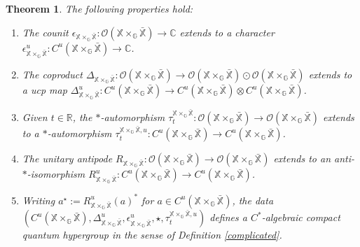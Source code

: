 \documentclass[reqno]{amsart}
\numberwithin{equation}{section}
\newtheorem{Theorem}{Theorem}[section]
\newcommand\XGX{\X\times_\G \bar{\X}}
\newcommand{\mcO}{\mathcal{O}}
\newcommand{\C}{\mathbb{C}}
\newcommand{\G}{\mathbb{G}}
\newcommand{\R}{\mathbb{R}}
\newcommand{\X}{\mathbb{X}}
\begin{document}
 \begin{Theorem}\label{mainCV} The following properties hold:
 \begin{enumerate}
     \item  The counit $\epsilon_{\XGX}: \mcO(\XGX)\to \C$ extends to a character $\epsilon_{\XGX}^u: C^u(\XGX)\to \C$.
  \item\vspace{-1.5mm} The coproduct $\Delta_{\XGX}: \mcO(\XGX)\to \mcO(\XGX)\odot \mcO(\XGX)$ extends to a ucp map $\Delta_{\XGX}^u: C^u(\XGX)\to C^u(\XGX)\otimes C^u(\XGX)$.
\item\vspace{-1.5mm} Given $t\in \R$, the $*$-automorphism $\tau^{\XGX}_t: \mcO(\XGX)\to \mcO(\XGX)$ extends to a $*$-automorphism $\tau_{t}^{\XGX,u}: C^u(\XGX)\to C^u(\XGX)$.
\item\vspace{-1.5mm} The unitary antipode $R_{\XGX}: \mcO(\XGX)\to \mcO(\XGX)$ extends to an anti-$*$-isomorphism $R_{\XGX}^u: C^u(\XGX)\to C^u(\XGX)$.
\item\vspace{-1.5mm} Writing $a^\star:= R_{\XGX}^u(a)^*$ for $a\in C^u(\XGX)$, the data $(C^u(\XGX), \Delta_{\XGX}^u, \epsilon_{\XGX}^u, \star, \tau_t^{\XGX,u})$ defines a $C^*$-algebraic compact quantum hypergroup in the sense of Definition \ref{complicated}.
     \end{enumerate}
 \end{Theorem}
\end{document}
